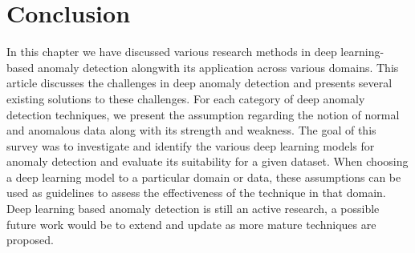 \section{Conclusion}
\label{sec:chapter1_conclusion}
In this chapter we have discussed various research methods in deep learning-based anomaly detection
alongwith its application across various domains. This article discusses the challenges in deep anomaly detection and presents  several existing solutions to these challenges. For each category of deep anomaly detection techniques, we present the assumption regarding the notion of normal and anomalous data along with its strength and weakness.  The goal of this survey was to investigate and identify the various deep learning models  for anomaly detection and evaluate its suitability for a given dataset. When choosing a deep learning model to a particular domain or data, these assumptions can be used as guidelines to assess the effectiveness of the technique in that domain. Deep learning based anomaly detection is still an active research, a possible future work would be to extend and update as more mature techniques are proposed.



